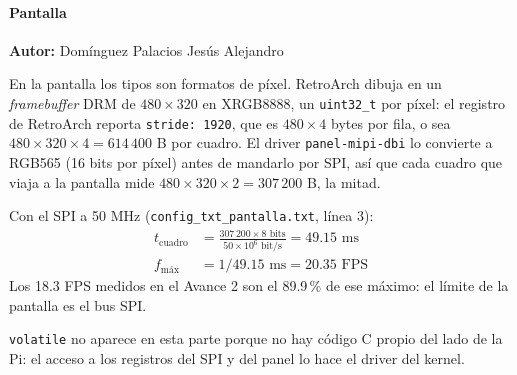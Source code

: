 \paragraph{Pantalla}
\textbf{Autor:} Domínguez Palacios Jesús Alejandro

En la pantalla los tipos son formatos de píxel. RetroArch dibuja en un \textit{framebuffer} DRM de
$480 \times 320$ en XRGB8888, un \texttt{uint32\_t} por píxel: el registro de RetroArch reporta
\texttt{stride: 1920}, que es $480 \times 4$ bytes por fila, o sea $480 \times 320 \times 4 = 614\,400$ B por cuadro.
El driver \texttt{panel-mipi-dbi} lo convierte a RGB565 (16 bits por píxel) antes de mandarlo por SPI, así que cada
cuadro que viaja a la pantalla mide $480 \times 320 \times 2 = 307\,200$ B, la mitad.

Con el SPI a 50 MHz (\texttt{config\_txt\_pantalla.txt}, línea 3):
\begin{align*}
t_{\text{cuadro}} &= \frac{307\,200 \times 8\text{ bits}}{50 \times 10^{6}\text{ bit/s}} = 49.15\text{ ms} \\
f_{\text{máx}} &= 1 / 49.15\text{ ms} = 20.35\text{ FPS}
\end{align*}
Los 18.3 FPS medidos en el Avance 2 son el 89.9\,\% de ese máximo: el límite de la pantalla es el bus SPI.

\texttt{volatile} no aparece en esta parte porque no hay código C propio del lado de la Pi: el acceso a los
registros del SPI y del panel lo hace el driver del kernel.
